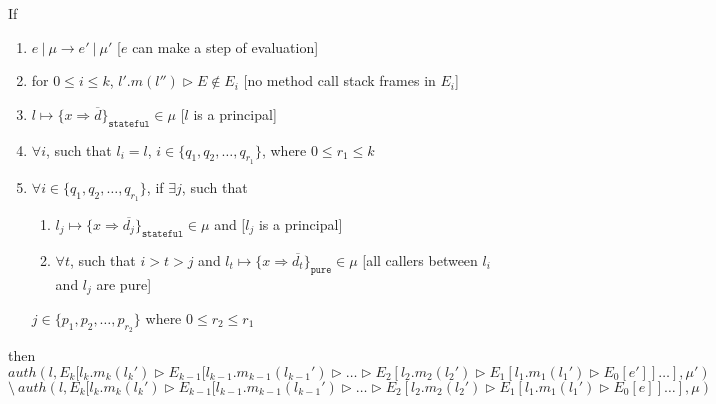 \documentclass{llncs}
\newcommand{\keywadj}[1]{\mathtt{#1}}
\newcommand{\intuition}[1]{#1}
\begin{document}
\newpage
\begin{mdframed}
\begin{lemma}
\label{l:a-diff}
If
\begin{enumerate}
\item $e~|~\mu \longrightarrow e'~|~\mu'$ \intuition{\hspace{230pt} [$e$ can make a step of evaluation]}
\item for $0 \leq i \leq k$, $l'.m(l'') \rhd E \not\in E_i$ \intuition{\hspace{150pt} [no method call stack frames in $E_i$]}
\item $l \mapsto \{ x \Rightarrow \overline{d} \}_{\keywadj{stateful}} \in \mu$ \intuition{\hspace{270pt} [$l$ is a principal]}
\item $\forall i$, such that $l_i = l$, $i \in \{ q_1, q_2, \dots, q_{r_1} \}$, where $0 \leq r_1 \leq k$ \intuition{}
\item $\forall i \in \{ q_1, q_2, \dots, q_{r_1} \}$, if $\exists j$, such that
\begin{enumerate}
\item $l_j \mapsto \{ x \Rightarrow \overline{d_j} \}_{\keywadj{stateful}} \in \mu$ and \intuition{\hspace{220pt} [$l_j$ is a principal]}
\item $\forall t$, such that $i > t > j$ and $l_t \mapsto \{ x \Rightarrow \overline{d_t} \}_{\keywadj{pure}} \in \mu$ \intuition{\hspace{40pt} [all callers between $l_i$ and $l_j$ are pure]}
\end{enumerate}
$j \in \{ p_1, p_2, \dots, p_{r_2}\}$ where $0 \leq r_2 \leq r_1$
\intuition{}
\end{enumerate}
then
\noindent$auth(l, E_k[l_k.m_k(l_k') \rhd E_{k-1}[l_{k-1}.m_{k-1}(l_{k-1}') \rhd \dots \rhd E_2[l_2.m_2(l_2') \rhd E_1[l_1.m_1(l_1') \rhd E_0[e']] \dots ], \mu')$\\
$\setminus~auth(l, E_k[l_k.m_k(l_k') \rhd E_{k-1}[l_{k-1}.m_{k-1}(l_{k-1}') \rhd \dots \rhd E_2[l_2.m_2(l_2') \rhd E_1[l_1.m_1(l_1') \rhd E_0[e]] \dots ], \mu)$

\end{lemma}
\end{mdframed}
\end{document}

